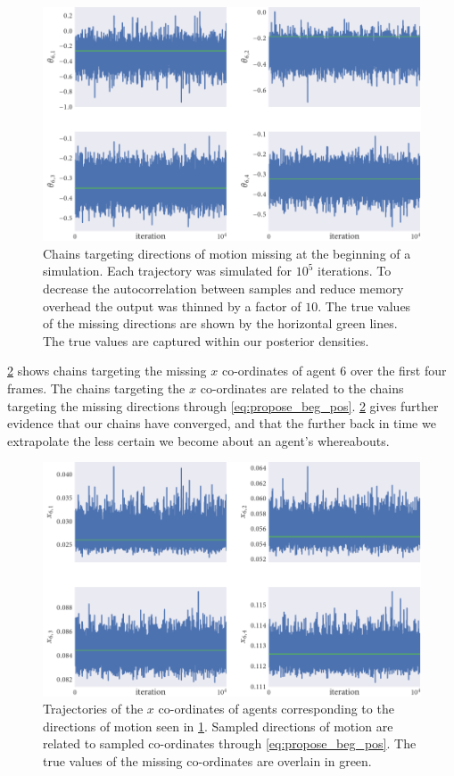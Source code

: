 \begin{figure}[tbp]
  \includegraphics{beg/dir_trace.pdf}
  \caption{Chains targeting directions of motion missing at the beginning of a
    simulation. Each trajectory was simulated for $10^5$ iterations. To
    decrease the autocorrelation between samples and reduce memory overhead
    the output was thinned by a factor of $10$. The true values of the
    missing directions are shown by the horizontal green lines. The true
    values are captured within our posterior densities.}
  \label{fig:beg_dir_trace}
\end{figure}

\cref{fig:beg_x_trace} shows chains targeting the missing $x$ co-ordinates of
agent $6$ over the first four frames. The chains targeting the $x$ co-ordinates
are related to the chains targeting the missing directions through
\cref{eq:propose_beg_pos}. \cref{fig:beg_x_trace} gives further evidence that
our chains have converged, and that the further back in time we extrapolate the
less certain we become about an agent's whereabouts.

\begin{figure}[tbp]
  \includegraphics{beg/x_trace.pdf}
  \caption{Trajectories of the $x$ co-ordinates of agents corresponding to the
  directions of motion seen in \cref{fig:beg_dir_trace}. Sampled directions of
  motion are related to sampled co-ordinates through \cref{eq:propose_beg_pos}.
  The true values of the missing co-ordinates are overlain in green.}
  \label{fig:beg_x_trace}
\end{figure}

